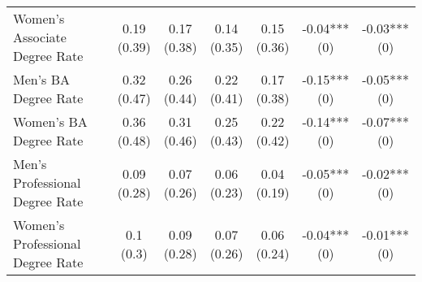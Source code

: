 \begin{landscape}
\begin{ThreePartTable}
\begin{longtable}[t]{>{\raggedright\arraybackslash}p{5cm}cccccc}
\hspace{1em}Women’s Associate Degree Rate & \specialcell{0.19\\(0.39)} & \specialcell{0.17\\(0.38)} & \specialcell{0.14\\(0.35)} & \specialcell{0.15\\(0.36)} & \specialcell{-0.04***\\(0)} & \specialcell{-0.03***\\(0)}\\
\hspace{1em}Men’s BA Degree Rate & \specialcell{0.32\\(0.47)} & \specialcell{0.26\\(0.44)} & \specialcell{0.22\\(0.41)} & \specialcell{0.17\\(0.38)} & \specialcell{-0.15***\\(0)} & \specialcell{-0.05***\\(0)}\\
\hspace{1em}Women’s BA Degree Rate & \specialcell{0.36\\(0.48)} & \specialcell{0.31\\(0.46)} & \specialcell{0.25\\(0.43)} & \specialcell{0.22\\(0.42)} & \specialcell{-0.14***\\(0)} & \specialcell{-0.07***\\(0)}\\
\hspace{1em}Men’s Professional Degree Rate & \specialcell{0.09\\(0.28)} & \specialcell{0.07\\(0.26)} & \specialcell{0.06\\(0.23)} & \specialcell{0.04\\(0.19)} & \specialcell{-0.05***\\(0)} & \specialcell{-0.02***\\(0)}\\
\addlinespace
\hspace{1em}Women’s Professional Degree Rate & \specialcell{0.1\\(0.3)} & \specialcell{0.09\\(0.28)} & \specialcell{0.07\\(0.26)} & \specialcell{0.06\\(0.24)} & \specialcell{-0.04***\\(0)} & \specialcell{-0.01***\\(0)}\\

\end{longtable}
\end{ThreePartTable}
\end{landscape}
